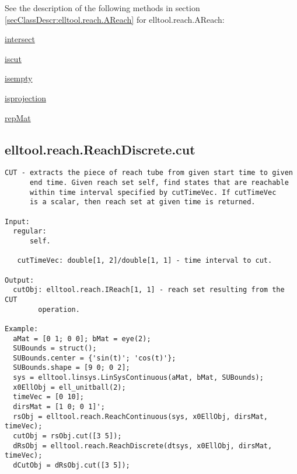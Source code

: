 See the description of the following methods in section \ref{secClassDescr:elltool.reach.AReach}
 for elltool.reach.AReach:

\begin{list}{}{}
 \item \hyperref[method:elltool.reach.AReach.intersect]{intersect}
 \item \hyperref[method:elltool.reach.AReach.iscut]{iscut}
 \item \hyperref[method:elltool.reach.AReach.isempty]{isempty}
 \item \hyperref[method:elltool.reach.AReach.isprojection]{isprojection}
 \item \hyperref[method:elltool.reach.AReach.repMat]{repMat}
\end{list}
\subsection{\texorpdfstring{elltool.reach.ReachDiscrete.cut}{cut}}\label{method:elltool.reach.ReachDiscrete.cut}
\begin{verbatim}
CUT - extracts the piece of reach tube from given start time to given
      end time. Given reach set self, find states that are reachable
      within time interval specified by cutTimeVec. If cutTimeVec
      is a scalar, then reach set at given time is returned.

Input:
  regular:
      self.

   cutTimeVec: double[1, 2]/double[1, 1] - time interval to cut.

Output:
  cutObj: elltool.reach.IReach[1, 1] - reach set resulting from the CUT
        operation.

Example:
  aMat = [0 1; 0 0]; bMat = eye(2);
  SUBounds = struct();
  SUBounds.center = {'sin(t)'; 'cos(t)'};
  SUBounds.shape = [9 0; 0 2];
  sys = elltool.linsys.LinSysContinuous(aMat, bMat, SUBounds);
  x0EllObj = ell_unitball(2);
  timeVec = [0 10];
  dirsMat = [1 0; 0 1]';
  rsObj = elltool.reach.ReachContinuous(sys, x0EllObj, dirsMat, timeVec);
  cutObj = rsObj.cut([3 5]);
  dRsObj = elltool.reach.ReachDiscrete(dtsys, x0EllObj, dirsMat, timeVec);
  dCutObj = dRsObj.cut([3 5]);
\end{verbatim}
